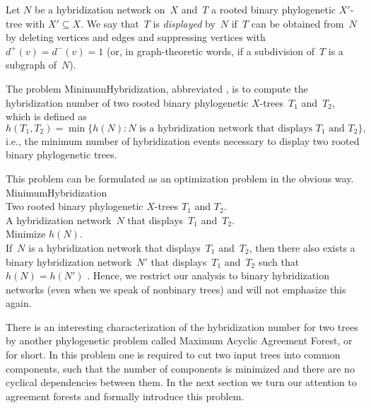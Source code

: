 Let $N$ be a hybridization network on~$X$ and~$T$ a rooted binary phylogenetic $X'$-tree with $X'\subseteq X$. We say that~$T$ is {\it displayed} by~$N$ if~$T$ can be obtained from~$N$ by deleting vertices and edges and suppressing vertices with $d^+(v)=d^-(v)=1$ (or, in graph-theoretic words, if a subdivision of~$T$ is a subgraph of~$N$). 

The problem {\sc MinimumHybridization}, abbreviated \mh, is to compute the {hybridization number} of two rooted binary phylogenetic $X$-trees~$T_1$ and~$T_2$, which is defined as
$$h(T_1,T_2)=\min\{h(N): N \mbox{ is a hybridization network that displays } T_1 \mbox{ and }T_2\},$$
i.e., the minimum number of hybridization events necessary to display two rooted binary phylogenetic trees.

This problem can be formulated as an optimization problem in the obvious way.\\

 {\sc MinimumHybridization}\\
 Two rooted binary phylogenetic $X$-trees $T_1$ and $T_2$. \\
 A hybridization network~$N$ that displays~$T_1$ and~$T_2$.\\
 Minimize $h(N)$.\\

If~$N$ is a hybridization network that displays~$T_1$ and~$T_2$, then there also exists a binary hybridization network~$N'$ that displays~$T_1$ and~$T_2$ such that $h(N)=h(N')$ \cite[Lemma~3]{twotrees}. Hence, we restrict our analysis to binary hybridization networks (even when we speak of nonbinary trees) and will not emphasize this again.


There is an interesting characterization of the hybridization number for two trees by another phylogenetic problem called Maximum Acyclic Agreement Forest, or \maaf for short. In this problem one is required to cut two input trees into common components, such that the number of components is minimized and there are no cyclical dependencies between them. In the next section we turn our attention to agreement forests and formally introduce this problem. 



